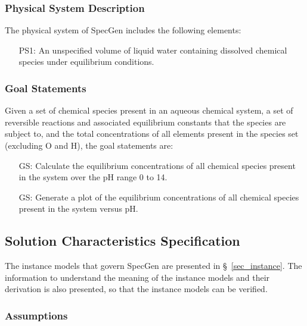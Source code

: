 \documentclass[12pt]{article}
\newcounter{goalnum} %
\newcommand{\sref}[1]{\S~\ref{#1}}
\newcommand{\progname}{SpecGen} %
\begin{document}
\subsubsection{Physical System Description}

The physical system of \progname{} includes the following elements:

\begin{itemize}

\item[PS1:] An unspecified volume of liquid water containing dissolved chemical species under equilibrium conditions.

\end{itemize}


\subsubsection{Goal Statements}

\noindent Given a set of chemical species present in an aqueous chemical system, a set of reversible reactions and associated equilibrium constants that the species are subject to, and the total concentrations of all elements present in the species set (excluding O and H), the goal statements are:

\begin{itemize}

\item[GS\refstepcounter{goalnum}\thegoalnum \label{G_solve}:] Calculate the equilibrium concentrations of all chemical species present in the system over the pH range 0 to 14.
\item[GS\refstepcounter{goalnum}\thegoalnum \label{G_plot}:] Generate a plot of the equilibrium concentrations of all chemical species present in the system versus pH.
\end{itemize}

\subsection{Solution Characteristics Specification}

The instance models that govern \progname{} are presented in
\sref{sec_instance}.  The information to understand the meaning of the
instance models and their derivation is also presented, so that the instance
models can be verified.

\subsubsection{Assumptions}
\end{document}
